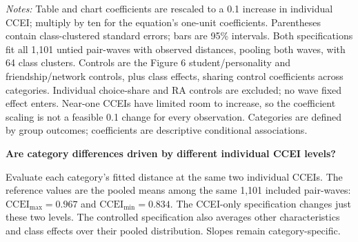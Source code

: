 \documentclass[11pt]{article}
\begin{document}
\footnotesize
\textit{Notes:} Table and chart coefficients are rescaled to a 0.1 increase in individual CCEI; multiply by ten for
the equation's one-unit coefficients. Parentheses contain class-clustered standard errors; bars are 95\% intervals.
Both specifications fit all 1,101 untied pair-waves with observed distances, pooling both waves, with 64 class clusters.
Controls are the Figure 6 student/personality and friendship/network controls, plus class effects, sharing control
coefficients across categories. Individual choice-share and RA controls are excluded; no wave fixed effect enters.
Near-one CCEIs have limited room to increase, so the coefficient scaling is not a feasible 0.1 change for every observation.
Categories are defined by group outcomes; coefficients are descriptive conditional associations.
\clearpage
\begin{center}\Large\textbf{Are category differences driven by different individual CCEI levels?}\end{center}
\small
Evaluate each category's fitted distance at the same two individual CCEIs. The reference values are the pooled means
among the same 1,101 included pair-waves:
$\mathrm{CCEI}_{\max}=0.967$ and $\mathrm{CCEI}_{\min}=0.834$.
The CCEI-only specification changes just these two levels. The controlled specification also averages other
characteristics and class effects over their pooled distribution. Slopes remain category-specific.
\end{document}
